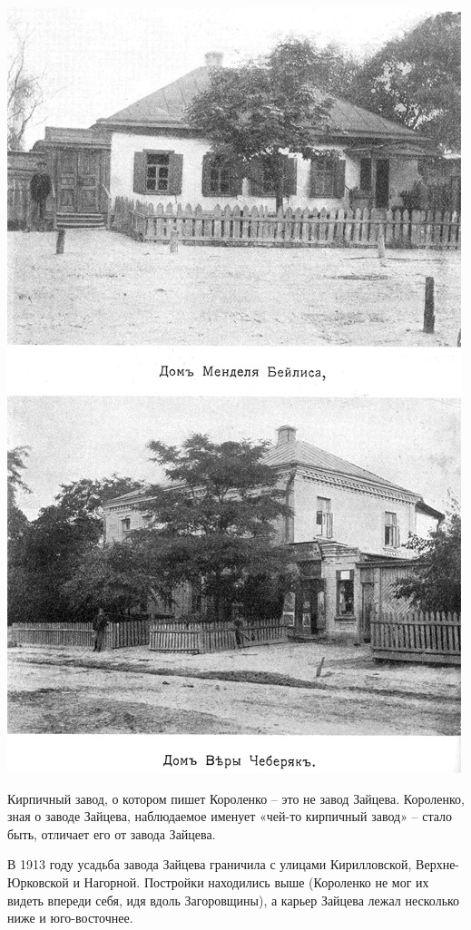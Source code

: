 \begin{center}
\includegraphics[width=\linewidth]{chast-kirvys/beylis/beylis-houses.jpg}
\end{center}


\newpage


Кирпичный завод, о котором пишет Короленко – это не завод Зайцева. Короленко, зная о заводе Зайцева, наблюдаемое именует «чей-то кирпичный завод» – стало быть, отличает его от завода Зайцева.

В 1913 году усадьба завода Зайцева граничила с улицами Кирилловской, Верхне-Юрковской и Нагорной. Постройки находились выше (Короленко не мог их видеть впереди себя, идя вдоль Загоровщины), а карьер Зайцева лежал несколько ниже и юго-восточнее.

